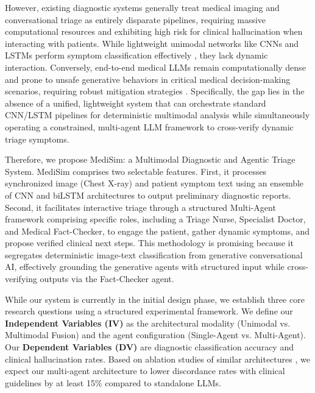 \documentclass[11pt,a4paper]{article}
\begin{document}
However, existing diagnostic systems generally treat medical imaging and conversational triage as entirely disparate pipelines, requiring massive computational resources and exhibiting high risk for clinical hallucination when interacting with patients. While lightweight unimodal networks like CNNs and LSTMs perform symptom classification effectively \citep{mullenbach2018explainable}, they lack dynamic interaction. Conversely, end-to-end medical LLMs remain computationally dense and prone to unsafe generative behaviors in critical medical decision-making scenarios, requiring robust mitigation strategies \citep{sahu2025occutriage}. Specifically, the gap lies in the absence of a unified, lightweight system that can orchestrate standard CNN/LSTM pipelines for deterministic multimodal analysis while simultaneously operating a constrained, multi-agent LLM framework to cross-verify dynamic triage symptoms.

Therefore, we propose MediSim: a Multimodal Diagnostic and Agentic Triage System. MediSim comprises two selectable features. First, it processes synchronized image (Chest X-ray) and patient symptom text using an ensemble of CNN and biLSTM architectures to output preliminary diagnostic reports. Second, it facilitates interactive triage through a structured Multi-Agent framework comprising specific roles, including a Triage Nurse, Specialist Doctor, and Medical Fact-Checker, to engage the patient, gather dynamic symptoms, and propose verified clinical next steps. This methodology is promising because it segregates deterministic image-text classification from generative conversational AI, effectively grounding the generative agents with structured input while cross-verifying outputs via the Fact-Checker agent.

While our system is currently in the initial design phase, we establish three core research questions using a structured experimental framework. We define our \textbf{Independent Variables (IV)} as the architectural modality (Unimodal vs. Multimodal Fusion) and the agent configuration (Single-Agent vs. Multi-Agent). Our \textbf{Dependent Variables (DV)} are diagnostic classification accuracy and clinical hallucination rates. Based on ablation studies of similar architectures \citep{lu2024triageagent}, we expect our multi-agent architecture to lower discordance rates with clinical guidelines by at least 15\% compared to standalone LLMs.
\end{document}
